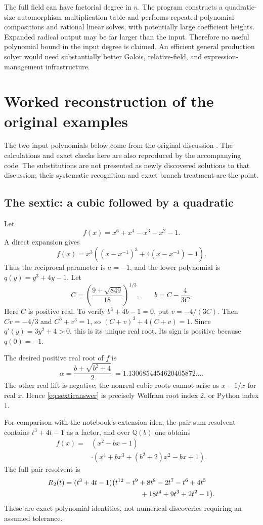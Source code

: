 \documentclass[11pt,letterpaper]{article}
\theoremstyle{definition}\newtheorem{definition}[theorem]{Definition}
\theoremstyle{remark}\newtheorem{remark}[theorem]{Remark}
\newcommand{\Q}{\mathbb Q}
\begin{document}
The full field can have factorial degree in $n$. The program constructs a
quadratic-size automorphism multiplication table and performs repeated
polynomial compositions and rational linear solves, with potentially large
coefficient heights. Expanded radical output may be far larger than the
input. Therefore no useful polynomial bound in the input degree is claimed.
An efficient general production solver would need substantially better
Galois, relative-field, and expression-management infrastructure.

\section{Worked reconstruction of the original examples}
\label{sec:examples}
The two input polynomials below come from the original discussion
\cite{question}. The calculations and exact checks here are also
reproduced by the accompanying code. The substitutions are not presented
as newly discovered solutions to that discussion; their systematic
recognition and exact branch treatment are the point.

\subsection{The sextic: a cubic followed by a quadratic}
Let
\[
 f(x)=x^6+x^4-x^3-x^2-1.
\]
A direct expansion gives
\begin{equation}\label{eq:sexticidentity}
 f(x)=x^3\left((x-x^{-1})^3+4(x-x^{-1})-1\right).
\end{equation}
Thus the reciprocal parameter is $a=-1$, and the lower polynomial is
$q(y)=y^3+4y-1$. Let
\[
 C=\left(\frac{9+\sqrt{849}}{18}\right)^{1/3},\qquad
 b=C-\frac{4}{3C}.
\]
Here $C$ is positive real. To verify $b^3+4b-1=0$, put $v=-4/(3C)$.
Then $Cv=-4/3$ and $C^3+v^3=1$, so
$(C+v)^3+4(C+v)=1$.
Since $q'(y)=3y^2+4>0$, this is its unique real root. Its sign is positive
because $q(0)=-1$.

The desired positive real root of $f$ is
\begin{equation}\label{eq:sexticanswer}
 \boxed{\alpha=\frac{b+\sqrt{b^2+4}}2}
 \ =1.1306854454620405872\ldots.
\end{equation}
The other real lift is negative; the nonreal cubic roots cannot arise as
$x-1/x$ for real $x$. Hence \eqref{eq:sexticanswer} is precisely Wolfram
root index $2$, or Python index $1$.

For comparison with the notebook's extension idea, the pair-sum resolvent
contains $t^3+4t-1$ as a factor, and over $\Q(b)$ one obtains
\begin{align*}
 f(x)={}&(x^2-bx-1)\\[-2pt]
 &\cdot\left(x^4+bx^3+(b^2+2)x^2-bx+1\right).
\end{align*}
The full pair resolvent is
\begin{align*}
 R_2(t)={}&(t^3+4t-1)\bigl(t^{12}-t^9+8t^8-2t^7-t^6+4t^5\\
 &\hspace{33mm}+18t^4+9t^3+2t^2-1\bigr).
\end{align*}
These are exact polynomial identities, not numerical discoveries requiring
an assumed tolerance.
\end{document}
